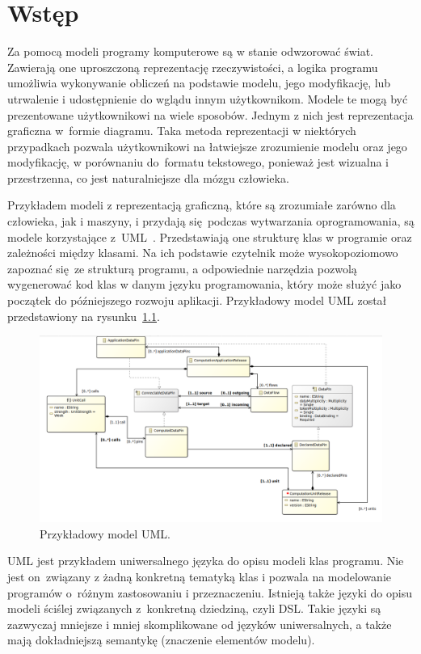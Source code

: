 \chapter{Wstęp}

Za pomocą modeli programy komputerowe są w stanie odwzorować świat.
Zawierają one uproszczoną reprezentację rzeczywistości, a logika programu
umożliwia wykonywanie obliczeń na podstawie modelu, jego modyfikację, lub
utrwalenie i udostępnienie do wglądu innym użytkownikom.
Modele te mogą być prezentowane użytkownikowi na wiele sposobów. Jednym z nich
jest reprezentacja graficzna w~formie diagramu. Taka metoda reprezentacji
w niektórych przypadkach pozwala użytkownikowi na łatwiejsze zrozumienie modelu
oraz jego modyfikację, w porównaniu do~formatu tekstowego, ponieważ jest
wizualna i przestrzenna, co jest naturalniejsze dla mózgu człowieka.

Przykładem modeli z reprezentacją graficzną, które są zrozumiałe zarówno dla
człowieka, jak i maszyny, i
przydają się podczas wytwarzania oprogramowania, są modele korzystające
z~\gls{UML}~\cite{wikipedia-uml}. Przedstawiają
one strukturę klas w programie oraz zależności między klasami. Na ich podstawie
czytelnik może wysokopoziomowo zapoznać się~ze strukturą programu, a
odpowiednie narzędzia pozwolą wygenerować kod klas w danym języku
programowania, który może służyć jako początek do późniejszego rozwoju
aplikacji. Przykładowy model \gls{UML} został przedstawiony na
rysunku~\ref{rys:przykladowy-model-uml}.

\begin{figure}[!hb]
	\centering
	\includegraphics[width=0.95\linewidth]{./images/example-uml-model.png}
	\caption{Przykładowy model \gls{UML}.}\label{rys:przykladowy-model-uml}
\end{figure}

\gls{UML} jest przykładem uniwersalnego języka do opisu modeli klas programu.
Nie jest on~związany z żadną konkretną tematyką klas i pozwala na modelowanie
programów o~różnym zastosowaniu i przeznaczeniu. Istnieją także języki do opisu
modeli ściślej związanych z~konkretną dziedziną, czyli \gls{DSL}. Takie języki
są zazwyczaj mniejsze i mniej skomplikowane od języków uniwersalnych, a także
mają dokładniejszą semantykę (znaczenie elementów modelu).


